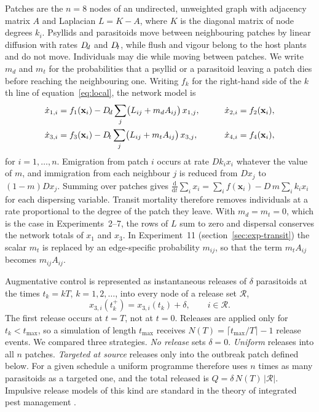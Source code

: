 Patches are the $n=8$ nodes of an undirected, unweighted graph with adjacency matrix $A$ and Laplacian $L = K - A$, where $K$ is the diagonal matrix of node degrees $k_i$. Psyllids and parasitoids move between neighbouring patches by linear diffusion with rates $D_{\!d}$ and $D_{\!t}$, while flush and vigour belong to the host plants and do not move. Individuals may die while moving between patches. We write $m_d$ and $m_t$ for the probabilities that a psyllid or a parasitoid leaving a patch dies before reaching the neighbouring one. Writing $f_k$ for the right-hand side of the $k$th line of equation~\eqref{eq:local}, the network model is
\begin{equation}
\begin{aligned}
\dot x_{1,i} &= f_1(\mathbf{x}_i) - D_{\!d}\sum_{j} \bigl(L_{ij} + m_d A_{ij}\bigr)\,x_{1,j}, &\qquad \dot x_{2,i} &= f_2(\mathbf{x}_i),\\
\dot x_{3,i} &= f_3(\mathbf{x}_i) - D_{\!t}\sum_{j} \bigl(L_{ij} + m_t A_{ij}\bigr)\,x_{3,j}, &\qquad \dot x_{4,i} &= f_4(\mathbf{x}_i),
\end{aligned}
\label{eq:network}
\end{equation}
for $i=1,\dots,n$. Emigration from patch $i$ occurs at rate $D k_i x_i$ whatever the value of $m$, and immigration from each neighbour $j$ is reduced from $D x_j$ to $(1-m)D x_j$. Summing over patches gives $\tfrac{\mathrm{d}}{\mathrm{d}t}\sum_i x_i = \sum_i f(\mathbf{x}_i) - D\,m\sum_i k_i x_i$ for each dispersing variable. Transit mortality therefore removes individuals at a rate proportional to the degree of the patch they leave. With $m_d = m_t = 0$, which is the case in Experiments~2--7, the rows of $L$ sum to zero and dispersal conserves the network totals of $x_1$ and $x_3$. In Experiment~11 (section~\ref{sec:exp-transit}) the scalar $m_t$ is replaced by an edge-specific probability $m_{ij}$, so that the term $m_t A_{ij}$ becomes $m_{ij}A_{ij}$.

Augmentative control is represented as instantaneous releases of $\delta$ parasitoids at the times $t_k = kT$, $k = 1,2,\dots$, into every node of a release set $\mathcal{R}$,
\begin{equation}
x_{3,i}(t_k^{+}) = x_{3,i}(t_k) + \delta,\qquad i\in\mathcal{R}.
\label{eq:impulse}
\end{equation}
The first release occurs at $t=T$, not at $t=0$. Releases are applied only for $t_k < t_{\max}$, so a simulation of length $t_{\max}$ receives $N(T) = \lceil t_{\max}/T\rceil - 1$ release events. We compared three strategies. \emph{No release} sets $\delta = 0$. \emph{Uniform} releases into all $n$ patches. \emph{Targeted at source} releases only into the outbreak patch defined below. For a given schedule a uniform programme therefore uses $n$ times as many parasitoids as a targeted one, and the total released is $Q = \delta\,N(T)\,|\mathcal{R}|$. Impulsive release models of this kind are standard in the theory of integrated pest management \citep{tang2008}.

